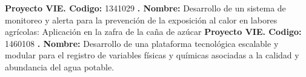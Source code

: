 \documentclass[landscape,12pt,dvipsnames]{article}%
\begin{document}
\vspace*{0.2cm}%
\newline%
\textbf{Proyecto VIE. Codigo: }%
1341029%
\textbf{. Nombre: }%
Desarrollo de un sistema de monitoreo y alerta para la prevención de la exposición al calor en labores agrícolas: Aplicación en la zafra de la caña de azúcar%
\vspace*{0.2cm}%
\newline%
\textbf{Proyecto VIE. Codigo: }%
1460108%
\textbf{. Nombre: }%
Desarrollo de una plataforma tecnológica escalable y modular para el registro de variables físicas y químicas asociadas a la calidad y abundancia del agua potable.%
\vspace*{0.2cm}%
\newline%
\end{document}
